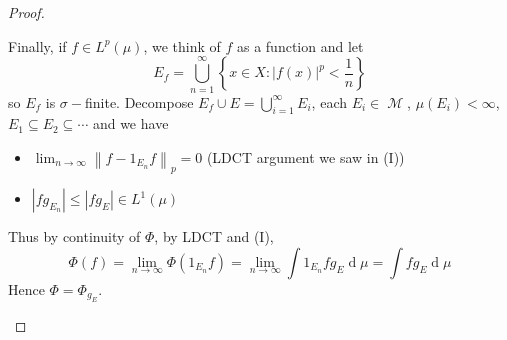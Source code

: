 \documentclass[11pt, a4paper]{memoir}
\newcommand{\norm}[1]{\ensuremath{\left\lVert#1\right\rVert}}
\theoremstyle{change}
\theoremstyle{plain}
\theoremstyle{nonumberplain}
\newtheorem{proof}{Proof}
\DeclareMathOperator{\M}{{\mathcal{M}}}
\renewcommand{\d}[1]{\ensuremath{\operatorname{d}\!{#1}}}
\numberwithin{equation}{section}
\begin{document}
\begin{proof}
\begin{enumerate}[r]
            Finally, if $f\in L^p(\mu)$, we think of $f$ as a function and let
            \begin{equation*}
                E_f=\bigcup_{n=1}^\infty\left\{x\in X:|f(x)|^p<\frac{1}{n}\right\}
            \end{equation*}
            so $E_f$ is $\sigma-$finite.
            Decompose $E_f\cup E=\bigcup_{i=1}^\infty E_i$, each $E_i\in\M$, $\mu(E_i)<\infty$, $E_1\subseteq E_2\subseteq\cdots$ and we have
            \begin{itemize}[nolistsep]
                \item $\lim_{n\to\infty}\norm{f-1_{E_n}f}_p=0$ (LDCT argument we saw in (I))
                \item $|fg_{E_n}|\leq|fg_E|\in L^1(\mu)$
            \end{itemize}
            Thus by continuity of $\Phi$, by LDCT and (I),
            \begin{equation*}
                \Phi(f)=\lim_{n\to\infty}\Phi(1_{E_n}f)=\lim_{n\to\infty}\int 1_{E_n}fg_E\d{\mu}=\int fg_E\d{\mu}
            \end{equation*}
            Hence $\Phi=\Phi_{g_E}$.
    \end{enumerate}
\end{proof}
\end{document}
